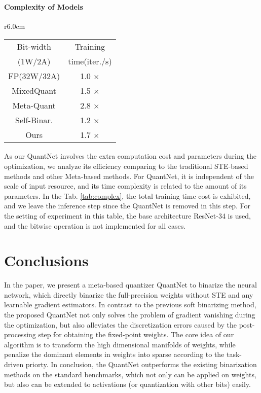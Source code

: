 \documentclass[runningheads]{llncs}
\begin{document}
\paragraph{\textbf{Complexity of Models}}
\begin{wraptable}{r}{6.0cm}
	\centering
    \begin{tabular}{cc}
    \hline
    Bit-width          &    Training        \\
    (1W/2A)            &  time(iter./s)     \\
    \hline
    FP(32W/32A)                          & 1.0  $\times$     \\
    MixedQuant   \cite{Uhlich2019DQ}     & 1.5  $\times$    \\
    Meta-Quant   \cite{chen2019meta}     & 2.8  $\times$    \\
    Self-Binar.  \cite{lahoud2019self}   & 1.2  $\times$    \\
    Ours                                 & 1.7  $\times$    \\
    \hline
	\end{tabular}
    \caption{Training time on ResNet-34}
    \label{tab:complex}
\end{wraptable}

As our QuantNet involves the extra computation cost and parameters during the optimization,
we analyze its efficiency comparing to the traditional STE-based methods and other Meta-based methods.
For QuantNet, it is independent of the scale of input resource,
and its time complexity is related to the amount of its parameters.
In the Tab. \ref{tab:complex}, the total training time cost is exhibited,
and we leave the inference step since the QuantNet is removed in this step.
For the setting of experiment in this table, the base architecture ResNet-34 is used,
and the bitwise operation is not implemented for all cases.

\section{Conclusions}
In the paper, we present a meta-based quantizer QuantNet to binarize the neural network,
which directly binarize the full-precision weights without STE and any learnable gradient estimators.
In contrast to the previous soft binarizing method,
the proposed QuantNet not only solves the problem of gradient vanishing during the optimization,
but also alleviates the discretization errors caused by the post-processing step for obtaining the fixed-point weights.
The core idea of our algorithm is to transform the high dimensional manifolds of weights,
while penalize the dominant elements in weights into sparse according to the task-driven priorty.
In conclusion, the QuantNet outperforms the existing binarization methods on the standard benchmarks,
which not only can be applied on weights, but also can be extended to activations (or quantization with other bits) easily.



\end{document}
